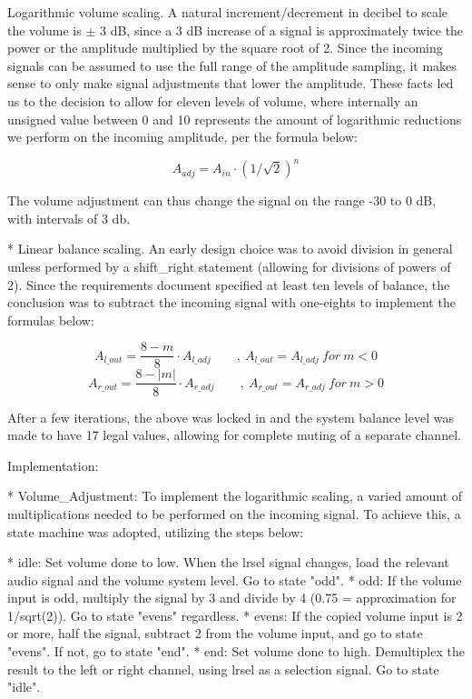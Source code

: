 Logarithmic volume scaling. A natural increment/decrement in decibel to scale the volume is $\pm$ 3 dB, since a 3 dB increase of a signal is approximately twice the power or the amplitude multiplied by the square root of 2. Since the incoming signals can be assumed to use the full range of the amplitude sampling, it makes sense to only make signal adjustments that lower the amplitude. These facts led us to the decision to allow for eleven levels of volume, where internally an unsigned value between 0 and 10 represents the amount of logarithmic reductions we perform on the incoming amplitude, per the formula below:
	
	
$$A_{adj} = A_{in} \cdot (1/\sqrt{2})^n$$

	The volume adjustment can thus change the signal on the range -30 to 0 dB, with intervals of 3 db.

	* Linear balance scaling. An early design choice was to avoid division in general unless performed by a shift\_right statement (allowing for divisions of powers of 2). Since the requirements document specified at least ten levels of balance, the conclusion was to subtract the incoming signal with one-eights to implement the formulas below:
	
$$A_{l\_out} = \frac{8 - m}{8} \cdot A_{l\_adj}\qquad,\ A_{l\_out} = A_{l\_adj}\ for\ m < 0$$
$$A_{r\_out} = \frac{8 - |m|}{8} \cdot A_{r\_adj}\qquad,\ A_{r\_out} = A_{r\_adj}\ for\ m > 0$$
	
	After a few iterations, the above was locked in and the system balance level was made to have 17 legal values, allowing for complete muting of a separate channel.
	
	
Implementation:

	* Volume\_Adjustment:
	To implement the logarithmic scaling, a varied amount of multiplications needed to be performed on the incoming signal. To achieve this, a state machine was adopted, utilizing the steps below:
	
	* idle: Set volume done to low. When the lrsel signal changes, load the relevant audio signal and the volume system level. Go to state "odd".
	* odd: If the volume input is odd, multiply the signal by 3 and divide by 4 (0.75 = approximation for 1/sqrt(2)). Go to state "evens" regardless.
	* evens: If the copied volume input is 2 or more, half the signal, subtract 2 from the volume input, and go to state "evens". If not, go to state "end".
	* end: Set volume done to high. Demultiplex the result to the left or right channel, using lrsel as a selection signal. Go to state "idle".

